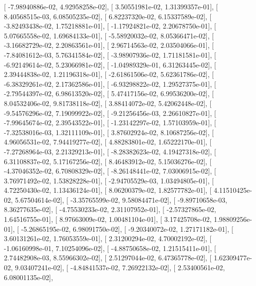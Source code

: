 \documentclass{article}
\begin{document}
       [ -7.98940886e-02,   4.92958258e-02],
       [  3.50551981e-02,   1.31399357e-01],
       [  8.40568515e-03,   6.08505235e-02],
       [  6.82237320e-02,   6.15337589e-02],
       [ -3.82493438e-02,   1.75218881e-01],
       [ -1.17924821e-02,   2.20678750e-01],
       [  5.07665558e-02,   1.69684133e-01],
       [ -5.58920032e-02,   8.05366471e-02],
       [ -3.16682729e-02,   2.20863561e-01],
       [  2.96714563e-02,   2.03504066e-01],
       [ -7.84081612e-03,   5.76341584e-02],
       [ -3.98907936e-02,   1.71181581e-01],
       [ -6.92149614e-02,   5.23066981e-02],
       [ -1.04989329e-01,   6.31263445e-02],
       [  2.39444838e-02,   1.21196318e-01],
       [ -2.61861506e-02,   5.62361786e-02],
       [ -6.38329261e-02,   2.17362586e-01],
       [ -6.93298822e-02,   1.29527375e-01],
       [ -2.79544397e-02,   6.98613520e-02],
       [  5.47417156e-02,   6.99536200e-02],
       [  8.04532406e-02,   9.81738118e-02],
       [  3.88414072e-02,   5.42062448e-02],
       [ -9.54576296e-02,   7.19099922e-02],
       [ -9.21256456e-03,   2.26610827e-01],
       [ -7.99645674e-02,   2.39543522e-01],
       [ -1.23142297e-02,   1.57103959e-01],
       [ -7.32538016e-03,   1.32111109e-01],
       [  3.87602924e-02,   8.10687256e-02],
       [  4.96056531e-02,   7.94419277e-02],
       [  4.88283801e-02,   1.65222170e-01],
       [ -7.27268964e-03,   2.21329213e-01],
       [ -8.28382623e-02,   4.19427318e-02],
       [  6.31108837e-02,   5.17167256e-02],
       [  8.46483912e-02,   5.15036276e-02],
       [ -4.37046352e-02,   6.70808329e-02],
       [ -8.26148441e-02,   7.03006915e-02],
       [  3.76971492e-02,   1.53828228e-01],
       [ -2.94705529e-03,   1.03494805e-01],
       [  4.72250430e-02,   1.13436124e-01],
       [  8.06200379e-02,   1.82577782e-01],
       [  4.11510425e-02,   5.67504614e-02],
       [ -3.35765599e-02,   9.58084471e-02],
       [ -9.89710658e-03,   8.36277635e-02],
       [ -4.75530233e-02,   2.31107952e-01],
       [ -2.57327865e-02,   1.64516755e-01],
       [  8.97663009e-02,   1.00481104e-01],
       [  3.17425708e-02,   1.98809256e-01],
       [ -5.26865195e-02,   6.98091750e-02],
       [ -9.20340072e-02,   1.27171182e-01],
       [  3.60131261e-02,   1.76053559e-01],
       [  2.31200294e-02,   4.70002192e-02],
       [ -1.06160998e-01,   7.10254096e-02],
       [ -4.88750658e-02,   1.21515411e-01],
       [  2.74482908e-03,   8.55966302e-02],
       [  2.51297044e-02,   6.47365778e-02],
       [  1.62309477e-02,   9.03407241e-02],
       [ -4.84841537e-02,   7.26922132e-02],
       [  2.53400561e-02,   6.08001135e-02],
\end{document}
